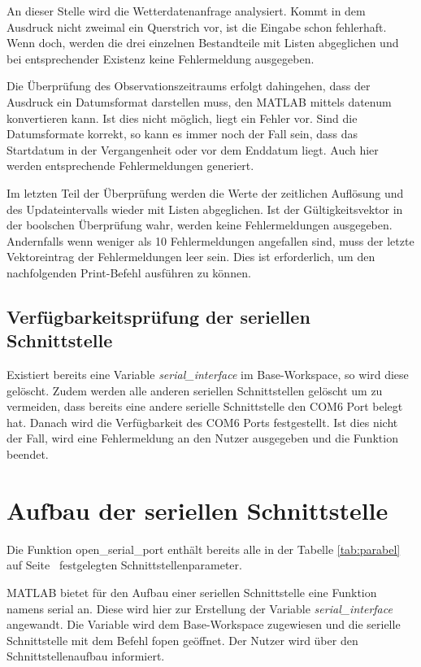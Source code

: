 
An dieser Stelle wird die Wetterdatenanfrage analysiert. Kommt in dem Ausdruck nicht zweimal ein Querstrich vor, ist die Eingabe schon fehlerhaft. Wenn doch, werden die drei einzelnen Bestandteile mit Listen abgeglichen und bei entsprechender Existenz keine Fehlermeldung ausgegeben.  

Die Überprüfung des Observationszeitraums erfolgt dahingehen, dass der Ausdruck ein Datumsformat darstellen muss, den MATLAB mittels \textsf{datenum} konvertieren kann. Ist dies nicht möglich, liegt ein Fehler vor. Sind die Datumsformate korrekt, so kann es immer noch der Fall sein, dass das Startdatum in der Vergangenheit oder vor dem Enddatum liegt. Auch hier werden entsprechende Fehlermeldungen generiert.

Im letzten Teil der Überprüfung werden die Werte der zeitlichen Auflösung und des Updateintervalls wieder mit Listen abgeglichen. Ist der Gültigkeitsvektor in der boolschen Überprüfung wahr, werden keine Fehlermeldungen ausgegeben. Andernfalls wenn weniger als 10 Fehlermeldungen angefallen sind, muss der letzte Vektoreintrag der Fehlermeldungen leer sein. Dies ist erforderlich, um den nachfolgenden Print-Befehl ausführen zu können. 
\subsection{Verfügbarkeitsprüfung der seriellen Schnittstelle}   
 
Existiert bereits eine Variable \textit{serial\_interface} im Base-Workspace, so wird diese gelöscht. Zudem werden alle anderen seriellen Schnittstellen gelöscht um zu vermeiden, dass bereits eine andere serielle Schnittstelle den COM6 Port belegt hat. Danach wird die Verfügbarkeit des COM6 Ports festgestellt. Ist dies nicht der Fall, wird eine Fehlermeldung an den Nutzer ausgegeben und die Funktion beendet.
\section{Aufbau der seriellen Schnittstelle}

Die Funktion \textsf{open\_serial\_port} enthält bereits alle in der Tabelle \ref{tab:parabel} auf Seite~\pageref{coilabfrage} festgelegten Schnittstellenparameter.

MATLAB bietet für den Aufbau einer seriellen Schnittstelle eine Funktion namens \textsf{serial} an. Diese wird hier zur Erstellung der Variable \textit{serial\_interface} angewandt. Die Variable wird dem Base-Workspace zugewiesen und die serielle Schnittstelle mit dem Befehl \textsf{fopen} geöffnet. Der Nutzer wird über den Schnittstellenaufbau informiert.
